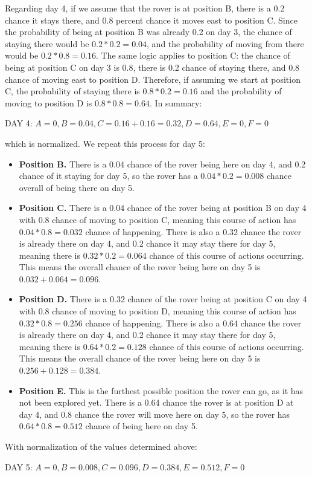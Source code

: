 \documentclass[12pt]{article}
\begin{document}
\begin{enumerate}[label=(\alph*)]
    Regarding day 4, if we assume that the rover is at position B, there is a 0.2 chance it stays there, and 0.8 percent chance it moves east to position C. Since the probability of being at position B was already 0.2 on day 3, the chance of staying there would be $0.2 * 0.2 = 0.04$, and the probability of moving from there would be $0.2 * 0.8 = 0.16$. The same logic applies to position C: the chance of being at position C on day 3 is 0.8, there is 0.2 chance of staying there, and 0.8 chance of moving east to position D. Therefore, if assuming we start at position C, the probability of staying there is $0.8 * 0.2 = 0.16$ and the probability of moving to position D is $0.8 * 0.8 = 0.64$. In summary:
    \begin{center}
        DAY 4: $A = 0, B = 0.04, C = 0.16 + 0.16 = 0.32, D = 0.64, E = 0, F = 0$
    \end{center}
    which is normalized. We repeat this process for day 5: 
    \begin{itemize}
        \item \textbf{Position B.} There is a 0.04 chance of the rover being here on day 4, and 0.2 chance of it staying for day 5, so the rover has a $0.04 * 0.2 = 0.008$ chance overall of being there on day 5.
        \item \textbf{Position C.} There is a 0.04 chance of the rover being at position B on day 4 with 0.8 chance of moving to position C, meaning this course of action has $0.04 * 0.8 = 0.032$ chance of happening. There is also a 0.32 chance the rover is already there on day 4, and 0.2 chance it may stay there for day 5, meaning there is $0.32 * 0.2 = 0.064$ chance of this course of actions occurring. This means the overall chance of the rover being here on day 5 is $0.032 + 0.064 = 0.096$.
        \item \textbf{Position D.} There is a 0.32 chance of the rover being at position C on day 4 with 0.8 chance of moving to position D, meaning this course of action has $0.32 * 0.8 = 0.256$ chance of happening. There is also a 0.64 chance the rover is already there on day 4, and 0.2 chance it may stay there for day 5, meaning there is $0.64 * 0.2 = 0.128$ chance of this course of actions occurring. This means the overall chance of the rover being here on day 5 is $0.256 + 0.128 = 0.384$.
        \item \textbf{Position E.} This is the furthest possible position the rover can go, as it has not been explored yet. There is a 0.64 chance the rover is at position D at day 4, and 0.8 chance the rover will move here on day 5, so the rover has $0.64 * 0.8 = 0.512$ chance of being here on day 5.
    \end{itemize}
    With normalization of the values determined above:
    \begin{center}
        DAY 5: $A = 0, B = 0.008, C = 0.096, D = 0.384, E = 0.512, F = 0$
    \end{center}
\end{enumerate}
\end{document}
